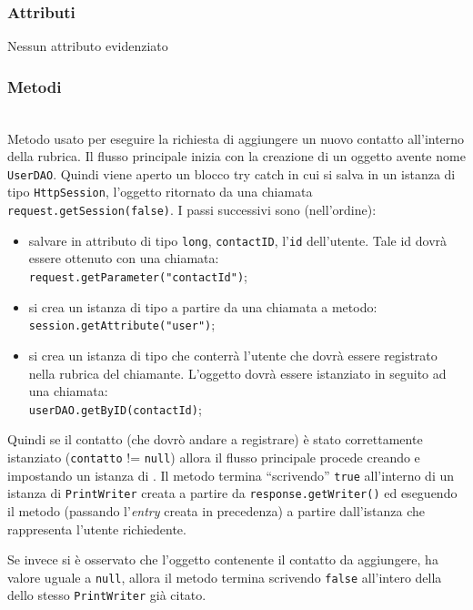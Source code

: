 \subsubsection*{Attributi}

Nessun attributo evidenziato

\subsubsection*{Metodi}
\begin{description}
	\item{}\\	
	Metodo usato per eseguire la richiesta di aggiungere un nuovo contatto all'interno della rubrica. Il flusso principale inizia  con la creazione di un oggetto  avente nome \texttt{UserDAO}. Quindi viene aperto un blocco try catch in cui si salva in un istanza di tipo \texttt{HttpSession}, l'oggetto ritornato da una chiamata \verb|request.getSession(false)|. I passi successivi sono (nell'ordine):
	\begin{itemize}
		\item salvare in attributo di tipo \texttt{long}, \texttt{contactID}, l'\texttt{id} dell'utente. Tale id dovrà essere ottenuto con una chiamata:\\
		\verb|request.getParameter("contactId")|;\\
		
		\item si crea un istanza di tipo  a partire da una chiamata a metodo:\\
		\verb|session.getAttribute("user")|;
		
		\item si crea un istanza di tipo  che conterrà l'utente che dovrà essere registrato nella rubrica del chiamante. L'oggetto dovrà essere istanziato in seguito ad una chiamata:\\
		\verb|userDAO.getByID(contactId)|;
	\end{itemize}
	Quindi se il contatto (che dovrò andare a registrare) è stato correttamente istanziato (\texttt{contatto} != \texttt{null}) allora il flusso principale procede creando e impostando un istanza di . Il metodo termina ``scrivendo'' \texttt{true} all'interno di un istanza di \texttt{PrintWriter} creata a partire da \texttt{response.getWriter()} ed eseguendo il metodo  (passando l'\textit{entry} creata in precedenza) a partire dall'istanza che rappresenta l'utente richiedente.
	
	Se invece si è osservato che l'oggetto contenente il contatto da aggiungere, ha valore uguale a \texttt{null}, allora il metodo termina scrivendo \texttt{false} all'intero della dello stesso \texttt{PrintWriter} già citato.
\end{description}

